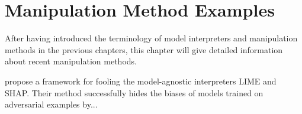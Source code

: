 \section{Manipulation Method Examples}
After having introduced the terminology of model interpreters and manipulation methods in the previous chapters, this chapter will give detailed information about recent manipulation methods. 

\cite{advlime_aies20} propose a framework for fooling the model-agnostic interpreters LIME and SHAP. Their method successfully hides the biases of models trained on adversarial examples by... 


% 



